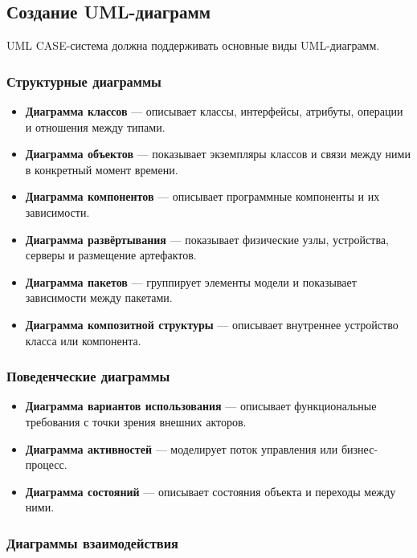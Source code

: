 \documentclass[12pt,a4paper]{article}
\begin{document}
\subsection{Создание UML-диаграмм}

UML CASE-система должна поддерживать основные виды UML-диаграмм.

\subsubsection{Структурные диаграммы}

\begin{itemize}
    \item \textbf{Диаграмма классов} --- описывает классы, интерфейсы, атрибуты, операции и отношения между типами.
    \item \textbf{Диаграмма объектов} --- показывает экземпляры классов и связи между ними в конкретный момент времени.
    \item \textbf{Диаграмма компонентов} --- описывает программные компоненты и их зависимости.
    \item \textbf{Диаграмма развёртывания} --- показывает физические узлы, устройства, серверы и размещение артефактов.
    \item \textbf{Диаграмма пакетов} --- группирует элементы модели и показывает зависимости между пакетами.
    \item \textbf{Диаграмма композитной структуры} --- описывает внутреннее устройство класса или компонента.
\end{itemize}

\subsubsection{Поведенческие диаграммы}

\begin{itemize}
    \item \textbf{Диаграмма вариантов использования} --- описывает функциональные требования с точки зрения внешних акторов.
    \item \textbf{Диаграмма активностей} --- моделирует поток управления или бизнес-процесс.
    \item \textbf{Диаграмма состояний} --- описывает состояния объекта и переходы между ними.
\end{itemize}

\subsubsection{Диаграммы взаимодействия}
\end{document}
